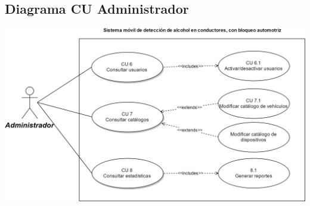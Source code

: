 \subsection{Diagrama CU Administrador}
\begin{center}
\includegraphics[scale=.2]{Capitulo3/img/diagramas/diagrama_casos_de_uso_administrador.png}
\label{fig:dcu_admin}
\end{center}
